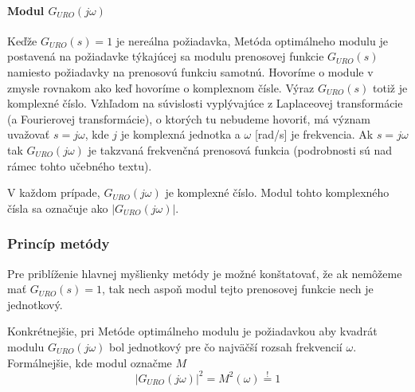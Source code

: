 \documentclass[a4paper, 10pt, ]{article}
\begin{document}
\paragraph{Modul $G_{URO}(j\omega)$}

Keďže $G_{URO}(s) = 1$ je nereálna požiadavka, Metóda optimálneho modulu je postavená na požiadavke týkajúcej sa modulu prenosovej funkcie $G_{URO}(s)$ namiesto požiadavky na prenosovú funkciu samotnú. Hovoríme o module v zmysle rovnakom ako keď hovoríme o komplexnom čísle. Výraz $G_{URO}(s)$ totiž je komplexné číslo. Vzhľadom na súvislosti vyplývajúce z Laplaceovej transformácie (a Fourierovej transformácie), o ktorých tu nebudeme hovoriť, má význam uvažovať $s = j\omega$, kde $j$ je komplexná jednotka a $\omega$ [rad/s] je frekvencia. Ak $s = j\omega$ tak $G_{URO}(j\omega)$ je takzvaná frekvenčná prenosová funkcia (podrobnosti sú nad rámec tohto učebného textu). 

V každom prípade, $G_{URO}(j\omega)$ je komplexné číslo. Modul tohto komplexného čísla sa označuje ako $ \left| G_{URO}(j\omega) \right| $.





\subsubsection{Princíp metódy}

Pre priblíženie hlavnej myšlienky metódy je možné konštatovať, že ak nemôžeme mať $G_{URO}(s) = 1$, tak nech aspoň modul tejto prenosovej funkcie nech je jednotkový.

Konkrétnejšie, pri Metóde optimálneho modulu je požiadavkou aby kvadrát modulu $G_{URO}(j\omega)$ bol jednotkový pre čo najväčší rozsah frekvencií $\omega$. Formálnejšie, kde modul označme $M$
\begin{equation}
    \left| G_{URO}(j\omega) \right|^2 = M^2(\omega) \overset{!}{=} 1
\end{equation}
\end{document}
